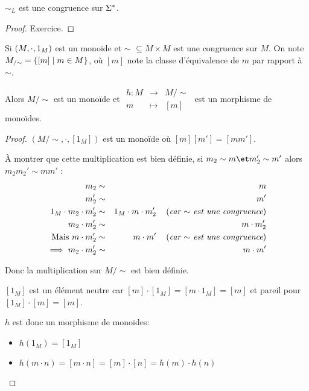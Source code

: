 \begin{prop}
	$\sim_L$ est une congruence sur $\Sigma^{*}$.
\end{prop}

\begin{proof}
	Exercice.
\end{proof}


\begin{prop}
	Si $(M, \cdot, 1_M)$ est un monoïde et $\sim$ $\subseteq M \times M$ est une congruence sur $M$. On note $M_{/\sim} = \left\{[m] \mid m \in M\right\}$, où $[m]$ note la classe d'équivalence de $m$ par rapport à $\sim$.

	Alors $M/\sim$ est un monoïde et $ \begin{array}{rcl}
			h : M & \to     & M/\sim \\
			m     & \mapsto & [m]
		\end{array} $ est un morphisme de monoïdes.
\end{prop}

\begin{proof}
	$(M/\sim, \cdot, [1_M])$ est un monoïde où $[m][m'] = [mm']$.

	À montrer que cette multiplication est bien définie, \cad si $m_2 \sim m \et m_2' \sim m'$ alors $m_2 m_2' \sim m m'$ :
	\begin{eqnarray*}
		m_2 &\sim& m \\
		m_2' &\sim& m' \\
		1_M \cdot  m_2 \cdot m_2' &\sim& 1_M \cdot m \cdot m_2' \quad\left(\textit{car $\sim$ est une congruence}\right) \\
		m_2 \cdot m_2' &\sim&  m \cdot m_2' \\
		\text{Mais } m \cdot m_2' &\sim& m \cdot m' \quad\left(\textit{car $\sim$ est une congruence}\right) \\
		\implies m_2 \cdot m_2' &\sim& m \cdot m'
	\end{eqnarray*}

	Donc la multiplication sur $M/\sim$ est bien définie.


	$[1_M]$ est un élément neutre car $[m]\cdot [1_M] = [m \cdot 1_M] = [m]$ et pareil pour $[1_M]\cdot [m] = [m]$.

	$h$ est donc un morphisme de monoïdes:

	\begin{itemize}
		\item  $h(1_M) = [1_M]$
		\item  $h(m\cdot n) = [m \cdot n] = [m] \cdot [n] = h(m) \cdot h(n)$
	\end{itemize}
\end{proof}

